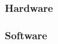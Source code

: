\documentclass{standalone}
\begin{document}
\subsubsection{Hardware}


\subsubsection{Software}

\end{document}
